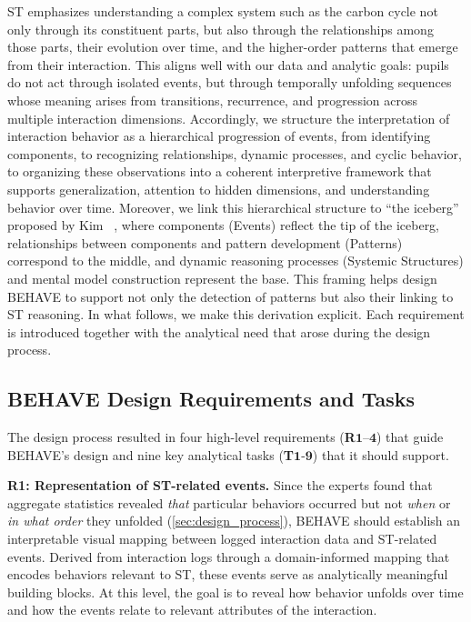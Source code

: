 \documentclass[letterpaper,journal]{IEEEtran}
\begin{document}
ST emphasizes understanding a complex system such as the carbon cycle not only through its constituent parts, but also through the relationships among those parts, their evolution over time, and the higher-order patterns that emerge from their interaction. 
This aligns well with our data and analytic goals: pupils do not act through isolated events, but through temporally unfolding sequences whose meaning arises from transitions, recurrence, and progression across multiple interaction dimensions. 
Accordingly, we structure the interpretation of interaction behavior as a hierarchical progression of events, from identifying components, to recognizing relationships, dynamic processes, and cyclic behavior, to organizing these observations into a coherent interpretive framework that supports generalization, attention to hidden dimensions, and understanding behavior over time. 
Moreover, we link this hierarchical structure to ``the iceberg'' proposed by Kim ~\cite{kim1999introduction}, where components (Events) reflect the tip of the iceberg, relationships between components and pattern development (Patterns) correspond to the middle, and dynamic reasoning processes (Systemic Structures) and mental model construction represent the base. 
This framing helps design \textsc{BEHAVE} to support not only the detection of patterns but also their linking to ST reasoning.
In what follows, we make this derivation explicit.
Each requirement is introduced together with the analytical need that arose during the design process.


\subsection{\textsc{BEHAVE} Design Requirements and Tasks}
\label{subsec:va_system_design}

The design process resulted in four high-level requirements (\textbf{R}$\mathbf{1}$--$\mathbf{4}$) that guide \textsc{BEHAVE}'s design and nine key analytical tasks (\textbf{T}$\mathbf{1}$-$\mathbf{9}$) that it should support.

\noindent
\textbf{R1: Representation of ST-related events.}
Since the experts found that aggregate statistics revealed \textit{that} particular behaviors occurred but not \textit{when} or \textit{in what order} they unfolded (\cref{sec:design_process}), \textsc{BEHAVE} should establish an interpretable visual mapping between logged interaction data and ST-related events. 
Derived from interaction logs through a domain-informed mapping that encodes behaviors relevant to ST, these events serve as analytically meaningful building blocks. 
At this level, the goal is to reveal how behavior unfolds over time and how the events relate to relevant attributes of the interaction.
\end{document}
